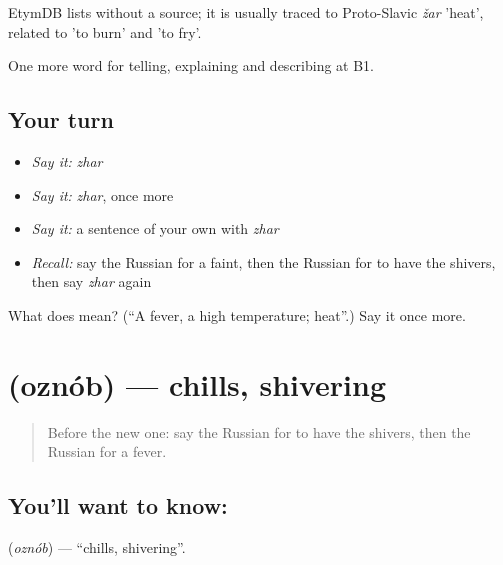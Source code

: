 \begin{cousinweb}
EtymDB lists \emph{} without a source; it is usually traced to Proto-Slavic \emph{žar} 'heat', related to \emph{} 'to burn' and \emph{} 'to fry'.
\end{cousinweb}

\begin{grammarlens}[title={What you've built}]
One more word for telling, explaining and describing at B1.
\end{grammarlens}

\subsection*{Your turn}
\begin{itemize}
\raggedright
  \item \emph{Say it:} \emph{zhar}
  \item \emph{Say it:} \emph{zhar}, once more
  \item \emph{Say it:} a sentence of your own with \emph{zhar}
  \item \emph{Recall:} say the Russian for a faint, then the Russian for to have the shivers, then say \emph{zhar} again
\end{itemize}

\begin{tcolorbox}[breakable,colback=teal!4,colframe=teal!35!black,title={Before you move on}]
What does  mean? (\textquotedblleft{}A fever, a high temperature; heat\textquotedblright{}.) Say it once more.
\end{tcolorbox}
\section[\texorpdfstring{\ru{озноб} (oznób)}{озноб (oznób)}]{ (oznób) — chills, shivering}

\label{lesson:RU-C486-oznob}



\begin{quote}
Before the new one: say the Russian for to have the shivers, then the Russian for a fever.
\end{quote}

\subsection*{You'll want to know: }
\textbf{} (\emph{oznób}) — \textquotedblleft{}chills, shivering\textquotedblright{}.

